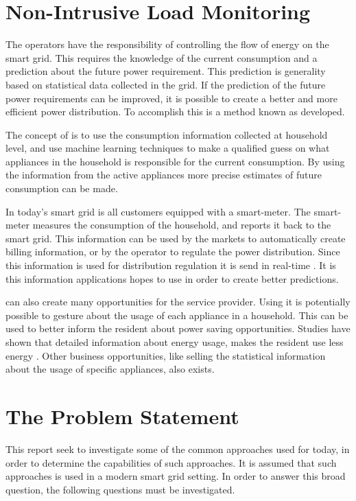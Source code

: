 \newpage
\section{Non-Intrusive Load Monitoring}
The operators have the responsibility of controlling the flow of energy on the smart grid. This requires the knowledge of the current consumption and a prediction about the future power requirement. This prediction is generality based on statistical data collected in the grid. If the prediction of the future power requirements can be improved, it is possible to create a better and more efficient power distribution. To accomplish this is a method known as  developed.

The concept of  is to use the consumption information collected at household level, and use machine learning techniques to make a qualified guess on what appliances in the household is responsible for the current consumption. By using the information from the active appliances more precise estimates of future consumption can be made. 

In today's smart grid is all customers equipped with a smart-meter. The smart-meter measures the consumption of the household, and reports it back to the smart grid. This information can be used by the markets to automatically create billing information, or by the operator to regulate the power distribution. Since this information is used for distribution regulation it is send in real-time \citep{RefWorks:41}. It is this information  applications hopes to use in order to create better predictions.

 can also create many opportunities for the service provider. Using  it is potentially possible to gesture about the usage of each appliance in a household. This can be used to better inform the resident about power saving opportunities. Studies have shown that detailed information about energy usage, makes the resident use less energy \citep{RefWorks:33}. Other business opportunities, like selling the statistical information about the usage of specific appliances, also exists.  

\section{The Problem Statement}

This report seek to investigate some of the common approaches used for  today, in order to determine the capabilities of such approaches. It is assumed that such approaches is used in a modern smart grid setting. In order to answer this broad question, the following questions must be investigated. 

